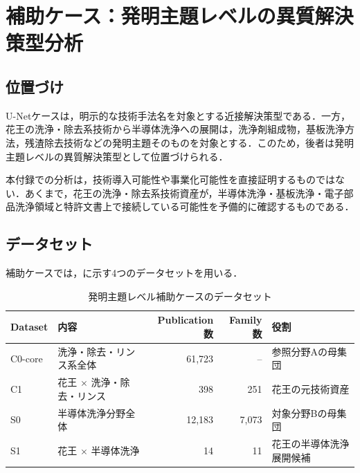 \chapter{補助ケース：発明主題レベルの異質解決策型分析}

\section{位置づけ}
U-Netケースは，明示的な技術手法名を対象とする近接解決策型である．一方，花王の洗浄・除去系技術から半導体洗浄への展開は，洗浄剤組成物，基板洗浄方法，残渣除去技術などの発明主題そのものを対象とする．このため，後者は発明主題レベルの異質解決策型として位置づけられる．

本付録での分析は，技術導入可能性や事業化可能性を直接証明するものではない．あくまで，花王の洗浄・除去系技術資産が，半導体洗浄・基板洗浄・電子部品洗浄領域と特許文書上で接続している可能性を予備的に確認するものである．

\section{データセット}
補助ケースでは，に示す4つのデータセットを用いる．

\begin{table}[htbp]
  \centering
  \caption{発明主題レベル補助ケースのデータセット}
  \label{tab:kao_dataset}
  \begin{tabularx}{\textwidth}{p{24mm}X r r X}
    \toprule
    Dataset & 内容 & Publication数 & Family数 & 役割 \\
    \midrule
    C0-core & 洗浄・除去・リンス系全体 & 61,723 & -- & 参照分野Aの母集団 \\
    C1 & 花王 $\times$ 洗浄・除去・リンス & 398 & 251 & 花王の元技術資産 \\
    S0 & 半導体洗浄分野全体 & 12,183 & 7,073 & 対象分野Bの母集団 \\
    S1 & 花王 $\times$ 半導体洗浄 & 14 & 11 & 花王の半導体洗浄展開候補 \\
    \bottomrule
  \end{tabularx}
\end{table}

